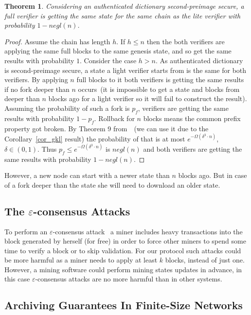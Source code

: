 \documentclass[conference,compsoc]{IEEEtran}
\newtheorem{theorem}{Theorem}
\begin{document}
\begin{theorem}
Considering an authenticated dictionary second-preimage secure, a full verifier is getting the same state for the same chain as the lite verifier with probability \(1 - negl(n)\).
\end{theorem}
\begin{proof}
Assume the chain has length \(h\). If \(h \le n\) then the both verifiers are applying the same full blocks to the same genesis state, and so get the same results with probability \(1\). Consider the case \(h > n \). As authenticated dictionary is second-preimage secure, a state a light verifier starts from is the same for both verifiers. By applying \(n\) full blocks to it both verifiers is getting the same results if no fork deeper than \(n\) occurs~(it is impossible to get a state and blocks from deeper than \(n\) blocks ago for a light verifier so it will fail to construct the result). Assuming the probability of such a fork is \(p_f\), verifiers are getting the same results with probability \(1 - p_f\). 
Rollback for \(n\) blocks means the common prefix property got broken. By Theorem 9 from~\cite{garay2015bitcoin}~(we can use it due to the Corollary~\ref{cor_gkl} result) the probability of that is at most \(e^{-\Omega(\delta^3 \cdot n)}\), \(\delta \in (0,1) \). Thus \( p_f \le e^{-\Omega(\delta^3 \cdot n)}\) is \(negl(n)\) and both verifiers are getting the same results with probability \(1 - negl(n)\).
\end{proof}


However, a new node can start with a newer state than \(n\) blocks ago. But in case of a fork deeper than the state she will need to download an older state.

\subsection{The \(\varepsilon\)-consensus Attacks}

To perform an \(\varepsilon\)-consensus attack~\cite{luu2015demystifying} a miner includes heavy transactions into the block generated by herself (for free) in order to force other miners to spend some time to verify a block or to skip validation. For our protocol such attacks could be more harmful as a miner needs to apply at least \(k\) blocks, instead of just one. However, a mining software could perform mining states updates in advance, in this case \(\varepsilon\)-consensus attacks are no more harmful than in other systems. 


\subsection{Archiving Guarantees In Finite-Size Networks}
\end{document}
